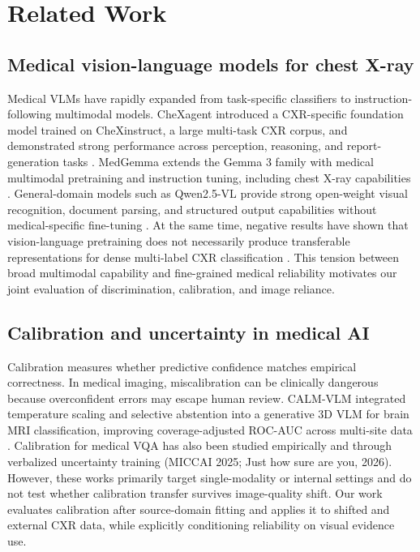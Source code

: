 \section{Related Work}

\subsection{Medical vision-language models for chest X-ray}

Medical VLMs have rapidly expanded from task-specific classifiers to instruction-following multimodal models. CheXagent introduced a CXR-specific foundation model trained on CheXinstruct, a large multi-task CXR corpus, and demonstrated strong performance across perception, reasoning, and report-generation tasks \citep{chen2024chexagent}. MedGemma extends the Gemma 3 family with medical multimodal pretraining and instruction tuning, including chest X-ray capabilities \citep{sellergren2025medgemma}. General-domain models such as Qwen2.5-VL provide strong open-weight visual recognition, document parsing, and structured output capabilities without medical-specific fine-tuning \citep{bai2025qwen25vl}. At the same time, negative results have shown that vision-language pretraining does not necessarily produce transferable representations for dense multi-label CXR classification \citep{fisher2025negative}. This tension between broad multimodal capability and fine-grained medical reliability motivates our joint evaluation of discrimination, calibration, and image reliance.

\subsection{Calibration and uncertainty in medical AI}

Calibration measures whether predictive confidence matches empirical correctness. In medical imaging, miscalibration can be clinically dangerous because overconfident errors may escape human review. CALM-VLM integrated temperature scaling and selective abstention into a generative 3D VLM for brain MRI classification, improving coverage-adjusted ROC-AUC across multi-site data \citep{dhinagar2026calm}. Calibration for medical VQA has also been studied empirically and through verbalized uncertainty training (MICCAI 2025; Just how sure are you, 2026). However, these works primarily target single-modality or internal settings and do not test whether calibration transfer survives image-quality shift. Our work evaluates calibration after source-domain fitting and applies it to shifted and external CXR data, while explicitly conditioning reliability on visual evidence use.

